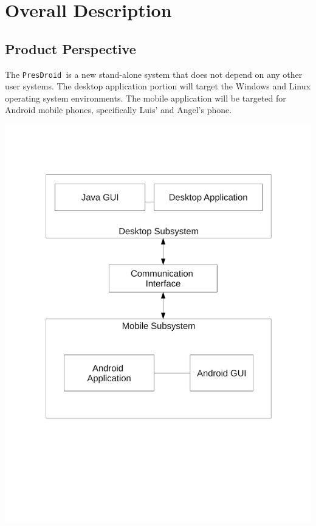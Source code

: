 \documentclass{article}
\newcommand{\pd}{\texttt{PresDroid }}
\begin{document}
\section{Overall Description}
\subsection{Product Perspective}
The \pd is a new stand-alone system that does not depend on any other user systems.  
The desktop application portion will target the Windows and Linux operating system environments.
The mobile application will be targeted for Android mobile phones, specifically Luis' and Angel's phone.

\begin{center}
\includegraphics[scale=0.4, trim = 0 5 0 5 cm, clip]{ppd}
\end{center}
\end{document}
